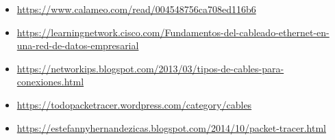 \documentclass{article}
\begin{document}
\begin{itemize}
    \item \href{https://www.calameo.com/read/004548756ca708ed116b6}{https://www.calameo.com/read/004548756ca708ed116b6}
    \item \href{https://learningnetwork.cisco.com/s/article/Fundamentos-del-cableado-ethernet-en-una-red-de-datos-empresarial}{https://learningnetwork.cisco.com/Fundamentos-del-cableado-ethernet-en-una-red-de-datos-empresarial}
    \item \href{https://networkips.blogspot.com/2013/03/tipos-de-cables-para-conexiones.html}{https://networkips.blogspot.com/2013/03/tipos-de-cables-para-conexiones.html}
    \item \href{https://todopacketracer.wordpress.com/category/cables/#:~:text=Crossover%20cable%20%2C%20Straight%20cable%2C%20rollover,y%20escuchan%20por%20cable%203.}{https://todopacketracer.wordpress.com/category/cables}
    \item \href{https://estefannyhernandezicas.blogspot.com/2014/10/packet-tracer.html}{https://estefannyhernandezicas.blogspot.com/2014/10/packet-tracer.html}
\end{itemize}
\end{document}

